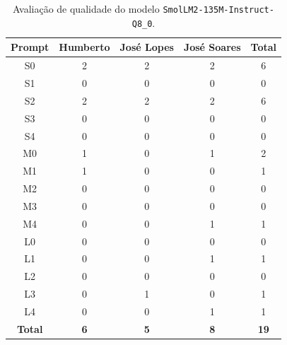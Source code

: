 \begin{table}[H]
    \centering
    \begin{tabular}{|c|c|c|c|c|}
        \hline
        \textbf{Prompt}      &
        \textbf{Humberto}    &
        \textbf{José Lopes}  &
        \textbf{José Soares} &
        \textbf{Total}       \\ \hline

        S0  & 2 & 2 & 2 & 6 \\ \hline
        S1  & 0 & 0 & 0 & 0 \\ \hline
        S2  & 2 & 2 & 2 & 6 \\ \hline
        S3  & 0 & 0 & 0 & 0 \\ \hline
        S4  & 0 & 0 & 0 & 0 \\ \hline
        M0 & 1 & 0 & 1 & 2 \\ \hline
        M1 & 1 & 0 & 0 & 1 \\ \hline
        M2 & 0 & 0 & 0 & 0 \\ \hline
        M3 & 0 & 0 & 0 & 0 \\ \hline
        M4 & 0 & 0 & 1 & 1 \\ \hline
        L0  & 0 & 0 & 0 & 0 \\ \hline
        L1  & 0 & 0 & 1 & 1 \\ \hline
        L2  & 0 & 0 & 0 & 0 \\ \hline
        L3  & 0 & 1 & 0 & 1 \\ \hline
        L4  & 0 & 0 & 1 & 1 \\ \hline

        \textbf{Total} & \textbf{6} & \textbf{5} & \textbf{8} & \textbf{19} \\ \hline
    \end{tabular}
    \caption{Avaliação de qualidade do modelo \texttt{SmolLM2-135M-Instruct-Q8\_0}.}
\end{table}

